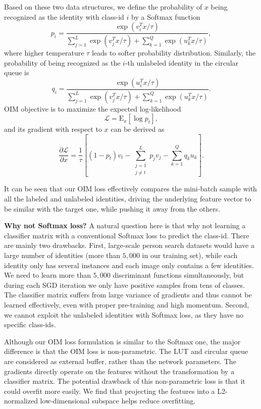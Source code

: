 \documentclass[10pt,twocolumn,letterpaper]{article}
\begin{document}
Based on these two data structures, we define the probability of $x$ being recognized as the identity with class-id $i$ by a Softmax function
\begin{equation} \label{eq:pi}
p_i=\frac{\exp(v_i^Tx/\tau)}{\sum_{j=1}^L\exp(v_j^Tx/\tau)+\sum_{k=1}^Q\exp(u_k^Tx/\tau)},
\end{equation}
where higher temperature $\tau$ leads to softer probability distribution. Similarly, the probability of being recognized as the $i$-th unlabeled identity in the circular queue is
\begin{equation} \label{eq:qi}
q_i=\frac{\exp(u_i^Tx/\tau)}{\sum_{j=1}^L\exp(v_j^Tx/\tau)+\sum_{k=1}^Q\exp(u_k^Tx/\tau)}.
\end{equation}
OIM objective is to maximize the expected log-likelihood
\begin{equation} \label{eq:loglik}
\mathcal{L}=\mathrm{E}_x\left[\log p_t\right],
\end{equation}
and its gradient with respect to $x$ can be derived as
\begin{equation}
\frac{\partial \mathcal{L}}{\partial x}=\frac{1}{\tau}\left[(1-p_t)v_t - \sum_{\substack{j=1\\j\ne t}}^L p_j v_j - \sum_{k=1}^Q q_k u_k\right].
\end{equation}

It can be seen that our OIM loss effectively compares the mini-batch sample with all the labeled and unlabeled identities, driving the underlying feature vector to be similar with the target one, while pushing it away from the others.

\textbf{Why not Softmax loss?} A natural question here is that why not learning a classifier matrix with a conventional Softmax loss to predict the class-id. There are mainly two drawbacks. First, large-scale person search datasets would have a large number of identities (more than $5,000$ in our training set), while each identity only has several instances and each image only contains a few identities. We need to learn more than $5,000$ discriminant functions simultaneously, but during each SGD iteration we only have positive samples from tens of classes. The classifier matrix suffers from large variance of gradients and thus cannot be learned effectively, even with proper pre-training and high momentum. Second, we cannot exploit the unlabeled identities with Softmax loss, as they have no specific class-ids.

Although our OIM loss formulation is similar to the Softmax one, the major difference is that the OIM loss is non-parametric. The LUT and circular queue are considered as external buffer, rather than the network parameters. The gradients directly operate on the features without the transformation by a classifier matrix. The potential drawback of this non-parametric loss is that it could overfit more easily. We find that projecting the features into a L2-normalized low-dimensional subspace helps reduce overfitting.
\end{document}
